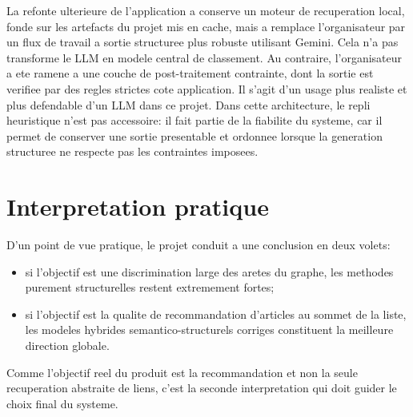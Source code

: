 La refonte ulterieure de l'application a conserve un moteur de recuperation
local, fonde sur les artefacts du projet mis en cache, mais a remplace
l'organisateur par un flux de travail a sortie structuree plus robuste utilisant
Gemini. Cela n'a pas transforme le LLM en modele central de classement. Au
contraire, l'organisateur a ete ramene a une couche de post-traitement
contrainte, dont la sortie est verifiee par des regles strictes cote
application. Il s'agit d'un usage plus realiste et plus defendable d'un LLM
dans ce projet. Dans cette architecture, le repli heuristique n'est pas
accessoire: il fait partie de la fiabilite du systeme, car il permet de
conserver une sortie presentable et ordonnee lorsque la generation structuree
ne respecte pas les contraintes imposees.

\section{Interpretation pratique}

D'un point de vue pratique, le projet conduit a une conclusion en deux volets:
\begin{itemize}
    \item si l'objectif est une discrimination large des aretes du graphe, les
    methodes purement structurelles restent extremement fortes;
    \item si l'objectif est la qualite de recommandation d'articles au sommet
    de la liste, les modeles hybrides semantico-structurels corriges
    constituent la meilleure direction globale.
\end{itemize}

Comme l'objectif reel du produit est la recommandation et non la seule
recuperation abstraite de liens, c'est la seconde interpretation qui doit
guider le choix final du systeme.
